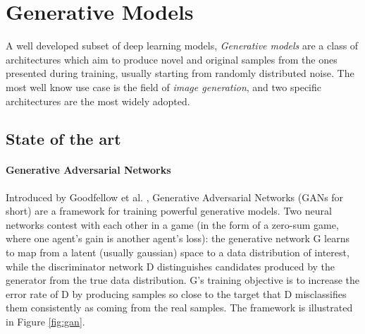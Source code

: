 \section{Generative Models} 

A well developed subset of deep learning models, \emph{Generative models} are a class of architectures which aim to produce novel and original samples from the ones presented during training, usually starting from randomly distributed noise. The most well know use case is the field of \emph{image generation}, and two specific architectures are the most widely adopted.

\subsection{State of the art}

\paragraph{Generative Adversarial Networks}

Introduced by Goodfellow et al. \cite{gan}, Generative Adversarial Networks (GANs for short) are a framework for training powerful generative models. Two neural networks contest with each other in a game (in the form of a zero-sum game, where one agent's gain is another agent's loss): the generative network G learns to map from a latent (usually gaussian) space to a data distribution of interest, while the discriminator network D distinguishes candidates produced by the generator from the true data distribution. G's training objective is to increase the error rate of D by producing samples so close to the target that D misclassifies them consistently as coming from the real samples. The framework is illustrated in Figure \ref{fig:gan}.


